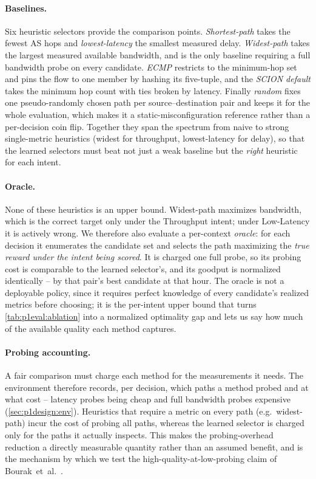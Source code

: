 \paragraph{Baselines.} Six heuristic selectors provide the comparison points. \emph{Shortest-path} takes
the fewest AS hops and \emph{lowest-latency} the smallest measured delay. \emph{Widest-path} takes the
largest measured available bandwidth, and is the only baseline requiring a full bandwidth probe on every
candidate. \emph{ECMP} restricts to the minimum-hop set and pins the flow to one member by hashing its
five-tuple, and the \emph{SCION default} takes the minimum hop count with ties broken by latency. Finally
\emph{random} fixes one pseudo-randomly chosen path per source--destination pair and keeps it for the
whole evaluation, which makes it a static-misconfiguration reference rather than a per-decision coin
flip. Together they span the spectrum from naive to strong single-metric heuristics (widest for
throughput, lowest-latency for delay), so that the learned selectors must beat not just a weak baseline
but the \emph{right} heuristic for each intent.

\paragraph{Oracle.} None of these heuristics is an upper bound. Widest-path maximizes bandwidth, which is
the correct target only under the Throughput intent; under Low-Latency it is actively wrong. We therefore
also evaluate a per-context \emph{oracle}: for each decision it enumerates the candidate set and selects
the path maximizing the \emph{true reward under the intent being scored}. It is charged one full probe,
so its probing cost is comparable to the learned selector's, and its goodput is normalized identically --
by that pair's best candidate at that hour. The oracle is not a deployable policy, since it requires
perfect knowledge of every candidate's realized metrics before choosing; it is the per-intent upper bound
that turns \cref{tab:p1eval:ablation} into a normalized optimality gap and lets us say how much of the
available quality each method captures.

\paragraph{Probing accounting.} A fair comparison must charge each method for the measurements it needs.
The environment therefore records, per decision, which paths a method probed and at what cost -- latency
probes being cheap and full bandwidth probes expensive (\cref{sec:p1design:env}). Heuristics that require
a metric on every path (e.g.\ widest-path) incur the cost of probing all paths, whereas the learned
selector is charged only for the paths it actually inspects. This makes the probing-overhead reduction a
directly measurable quantity rather than an assumed benefit, and is the mechanism by which we test the
high-quality-at-low-probing claim of Bourak~et~al.~\cite{Bourak2025}.

